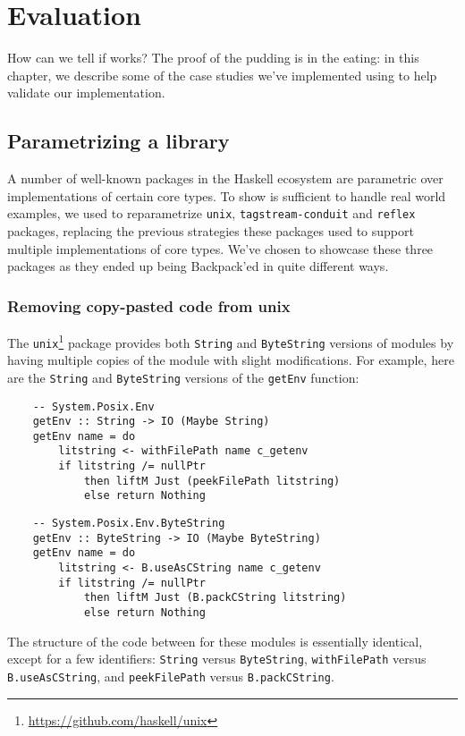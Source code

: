 
\chapter{Evaluation}
\label{sec:evaluation}


How can we tell if \Backpack{} works?  The proof of the pudding is
in the eating: in this chapter, we describe some of the case studies
we've implemented using \Backpack{} to help validate our implementation.

\section{Parametrizing a library}

A number of well-known packages in the Haskell ecosystem are parametric over
implementations of certain core types.  To show \Backpack{} is sufficient
to handle real world examples, we used \Backpack{} to
reparametrize \verb|unix|, \verb|tagstream-conduit| and \verb|reflex| packages, replacing
the previous strategies these packages used to support multiple
implementations of core types.  We've chosen to showcase these three
packages as they ended up being Backpack'ed in quite different ways.

\subsection{Removing copy-pasted code from unix}

The \texttt{unix}\footnote{\smaller\url{https://github.com/haskell/unix}} package provides both \verb|String| and
\verb|ByteString| versions of modules by having multiple copies of the
module with slight modifications.  For example,  here are the \verb|String|
and \verb|ByteString| versions of the \verb|getEnv| function:

\begin{lstlisting}
    -- System.Posix.Env
    getEnv :: String -> IO (Maybe String)
    getEnv name = do
        litstring <- withFilePath name c_getenv
        if litstring /= nullPtr
            then liftM Just (peekFilePath litstring)
            else return Nothing
\end{lstlisting}

\begin{lstlisting}
    -- System.Posix.Env.ByteString
    getEnv :: ByteString -> IO (Maybe ByteString)
    getEnv name = do
        litstring <- B.useAsCString name c_getenv
        if litstring /= nullPtr
            then liftM Just (B.packCString litstring)
            else return Nothing
\end{lstlisting}
%
The structure of the code between for these modules is essentially identical,
except for a few identifiers: \verb|String| versus \verb|ByteString|,
\verb|withFilePath| versus \verb|B.useAsCString|, and \verb|peekFilePath|
versus \verb|B.packCString|.

